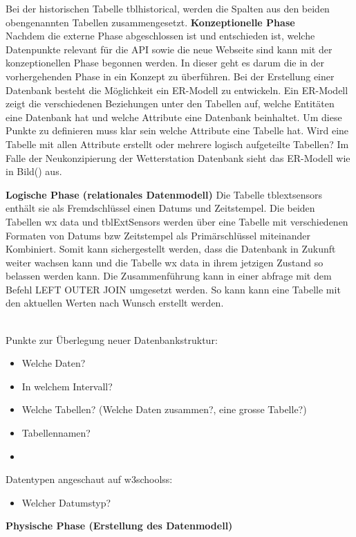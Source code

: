 Bei der historischen Tabelle tblhistorical, werden die Spalten aus den beiden obengenannten Tabellen zusammengesetzt. 
\textbf{Konzeptionelle Phase}\\
Nachdem die externe Phase abgeschlossen ist und entschieden ist, welche Datenpunkte relevant für die API sowie die neue Webseite sind kann mit der konzeptionellen Phase begonnen werden. In dieser geht es darum die in der vorhergehenden Phase in ein Konzept zu überführen. Bei der Erstellung einer Datenbank besteht die Möglichkeit ein ER-Modell zu entwickeln. Ein ER-Modell zeigt die verschiedenen Beziehungen unter den Tabellen auf, welche Entitäten eine Datenbank hat und welche Attribute eine Datenbank beinhaltet. Um diese Punkte zu definieren muss klar sein welche Attribute eine Tabelle hat. Wird eine Tabelle mit allen Attribute erstellt oder mehrere logisch aufgeteilte Tabellen? Im Falle der Neukonzipierung der Wetterstation Datenbank sieht das ER-Modell wie in Bild() aus.  

\textbf{Logische Phase (relationales Datenmodell)}
Die Tabelle tblextsensors  enthält sie als Fremdschlüssel einen Datums und Zeitstempel. Die beiden Tabellen wx data und tblExtSensors werden über eine Tabelle mit verschiedenen Formaten von Datums bzw Zeitstempel als Primärschlüssel miteinander Kombiniert. Somit kann sichergestellt werden, dass die Datenbank in Zukunft weiter wachsen kann und die Tabelle wx data in ihrem jetzigen Zustand so belassen werden kann. Die Zusammenführung kann in einer abfrage mit dem Befehl LEFT OUTER JOIN umgesetzt werden. So kann kann eine Tabelle mit den aktuellen Werten nach Wunsch erstellt werden.

\\

Punkte zur Überlegung neuer Datenbankstruktur:
\begin{itemize}
\item Welche Daten?
\item In welchem Intervall?
\item Welche Tabellen? (Welche Daten zusammen?, eine grosse Tabelle?)
\item Tabellennamen?
\item 
\end{itemize}

Datentypen angeschaut auf w3schoolss:
\begin{itemize}
\item Welcher Datumstyp?

\end{itemize}
\textbf{Physische Phase (Erstellung des Datenmodell)}

